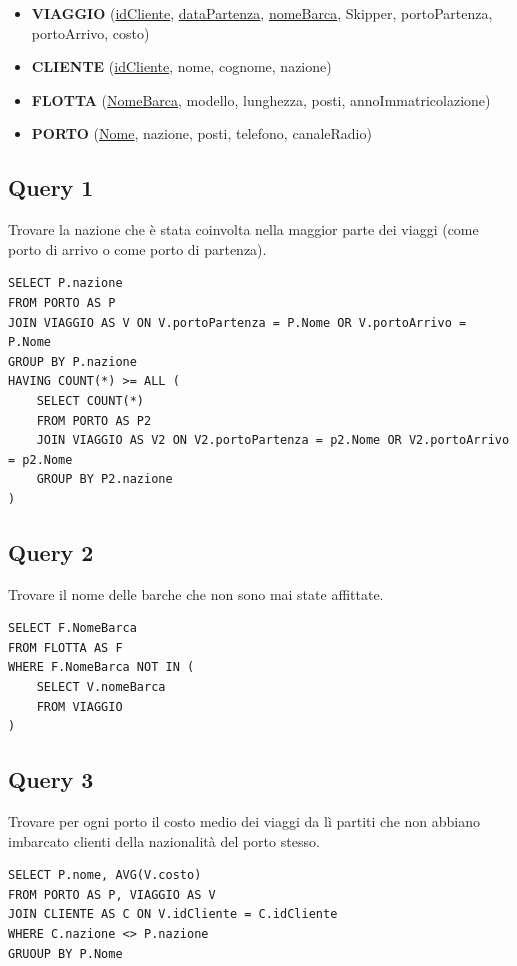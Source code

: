 \begin{itemize}
    \item \textbf{VIAGGIO} (\underline{idCliente}, \underline{dataPartenza}, \underline{nomeBarca}, Skipper, portoPartenza, portoArrivo, costo)
    \item \textbf{CLIENTE} (\underline{idCliente}, nome, cognome, nazione)
    \item \textbf{FLOTTA} (\underline{NomeBarca}, modello, lunghezza, posti, annoImmatricolazione)
    \item \textbf{PORTO} (\underline{Nome}, nazione, posti, telefono, canaleRadio)
\end{itemize}

\subsection{Query 1}
Trovare la nazione che è stata coinvolta nella maggior parte dei viaggi (come porto di arrivo o come porto di partenza).

\begin{lstlisting}
SELECT P.nazione
FROM PORTO AS P
JOIN VIAGGIO AS V ON V.portoPartenza = P.Nome OR V.portoArrivo = P.Nome
GROUP BY P.nazione
HAVING COUNT(*) >= ALL (
    SELECT COUNT(*)
    FROM PORTO AS P2
    JOIN VIAGGIO AS V2 ON V2.portoPartenza = p2.Nome OR V2.portoArrivo = p2.Nome
    GROUP BY P2.nazione
)
\end{lstlisting}

\subsection{Query 2}
Trovare il nome delle barche che non sono mai state affittate.
\begin{lstlisting}
SELECT F.NomeBarca
FROM FLOTTA AS F
WHERE F.NomeBarca NOT IN (
    SELECT V.nomeBarca
    FROM VIAGGIO
)
\end{lstlisting}
\subsection{Query 3}
Trovare per ogni porto il costo medio dei viaggi da lì partiti che non abbiano imbarcato clienti della nazionalità del porto stesso.

\begin{lstlisting}
SELECT P.nome, AVG(V.costo)
FROM PORTO AS P, VIAGGIO AS V
JOIN CLIENTE AS C ON V.idCliente = C.idCliente
WHERE C.nazione <> P.nazione
GRUOUP BY P.Nome
\end{lstlisting}

